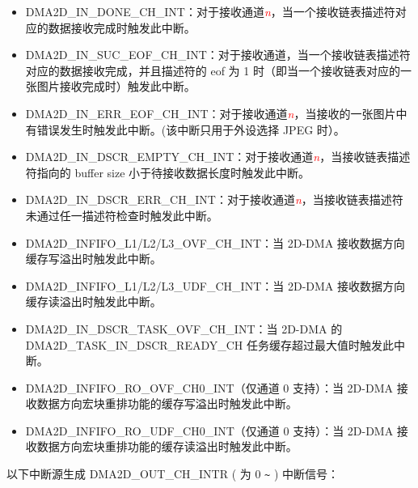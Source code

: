 \documentclass[main\_\_CN.tex]{subfiles}
\begin{document}
\begin{itemize}
    \item \label{int:DMA2DINDONEINT}DMA2D\_IN\_DONE\_CH\_INT：对于接收通道\textcolor{red}{\it{n}}，当一个接收链表描述符对应的数据接收完成时触发此中断。
    \item \label{int:DMA2DINSUCEOFINT}DMA2D\_IN\_SUC\_EOF\_CH\_INT：对于接收通道，当一个接收链表描述符对应的数据接收完成，并且描述符的 eof 为 1 时（即当一个接收链表对应的一张图片接收完成时）触发此中断。
    \item \label{int:DMA2DINERREOFINT}DMA2D\_IN\_ERR\_EOF\_CH\_INT：对于接收通道\textcolor{red}{\it{n}}，当接收的一张图片中有错误发生时触发此中断。(该中断只用于外设选择 JPEG 时）。
    \item \label{int:DMA2DINDSCREMPTYINT}DMA2D\_IN\_DSCR\_EMPTY\_CH\_INT：对于接收通道\textcolor{red}{\it{n}}，当接收链表描述符指向的 buffer size 小于待接收数据长度时触发此中断。
    \item \label{int:DMA2DINDSCRERRINT}DMA2D\_IN\_DSCR\_ERR\_CH\_INT：对于接收通道\textcolor{red}{\it{n}}，当接收链表描述符未通过任一描述符检查时触发此中断。
    \item \label{int:DMA2DINFIFOOVFINT} DMA2D\_INFIFO\_L1/L2/L3\_OVF\_CH\_INT：当 2D-DMA 接收数据方向缓存写溢出时触发此中断。
    \item \label{int:DMA2DINFIFOUDFINT} DMA2D\_INFIFO\_L1/L2/L3\_UDF\_CH\_INT：当 2D-DMA 接收数据方向缓存读溢出时触发此中断。
    \item \label{int:DMA2DINDSCRTASKOVFINT} DMA2D\_IN\_DSCR\_TASK\_OVF\_CH\_INT：当 2D-DMA 的 DMA2D\_TASK\_IN\_DSCR\_READY\_CH 任务缓存超过最大值时触发此中断。
    \item \label{int:DMA2DINFIFOROOVFINT} DMA2D\_INFIFO\_RO\_OVF\_CH0\_INT（仅通道 0 支持）：当 2D-DMA 接收数据方向宏块重排功能的缓存写溢出时触发此中断。
    \item \label{int:DMA2DINFIFOROUDFINT} DMA2D\_INFIFO\_RO\_UDF\_CH0\_INT（仅通道 0 支持）：当 2D-DMA 接收数据方向宏块重排功能的缓存读溢出时触发此中断。
\end{itemize}

以下中断源生成 DMA2D\_OUT\_CH\_INTR ( 为 0 \verb+~+ ) 中断信号：
\end{document}
